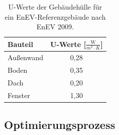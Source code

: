 \begin{table}[H]\centering
\begin{tabular}{|l|c|}
\hline
\rowcolor[HTML]{C0C0C0} 
Bauteil & U-Werte {[}\(\frac{\text{W}}{m^2 \cdot K}\){]} \\ \hline
Außenwand & 0,28 \\ \hline
\rowcolor[HTML]{EFEFEF} 
Boden & 0,35 \\ \hline
Dach & 0,20 \\ \hline
\rowcolor[HTML]{EFEFEF} 
Fenster & 1,30 \\ \hline
\end{tabular}
\caption{U-Werte der Gebäudehülle für ein EnEV-Referenzgebäude nach EnEV 2009.}
\label{tab: Tabelle2612}
\end{table}

\subsection{Optimierungsprozess}
\label{subsec:Sektion262}

